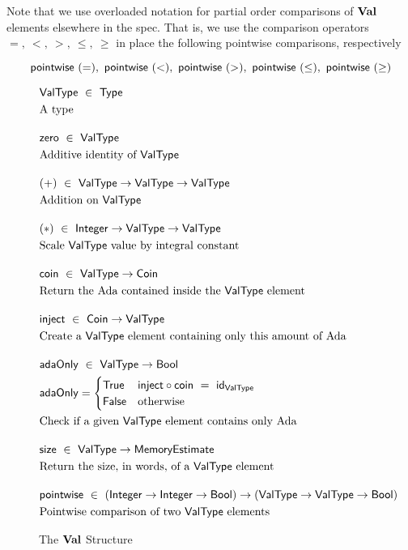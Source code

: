 Note that we use overloaded notation
for partial order comparisons of $\mathbf{Val}$ elements elsewhere in the spec. That is,
we use the comparison operators $=,~<,~>,~\leq,~\geq$ in place the following pointwise comparisons, respectively

\[ \mathsf{pointwise}~(=),~\mathsf{pointwise}~(<),~\mathsf{pointwise}~(>),~\mathsf{pointwise}~(\leq),~\mathsf{pointwise}~(\geq) \]

\begin{figure}[htb]
  \begin{align*}
      & \mathsf{ValType} ~\in~ \mathsf{Type}  \\
      & \text{A type}
      \nextdef
      & \fun{zero} ~\in~ \mathsf{ValType} \\
      & \text{Additive identity of $\mathsf{ValType}$}
      \nextdef
      & (+) ~\in~ \mathsf{ValType} \to \mathsf{ValType} \to \mathsf{ValType}\\
      & \text{Addition on $\mathsf{ValType}$}
      \nextdef
      & (*) ~\in~ \mathsf{Integer} \to \mathsf{ValType} \to \mathsf{ValType}\\
      & \text{Scale $\mathsf{ValType}$ value by integral constant}
      \nextdef
      & \fun{coin} ~\in~ \mathsf{ValType} \to \Coin\\
      & \text{Return the Ada contained inside the $\mathsf{ValType}$ element}
      \nextdef
      & \fun{inject} ~\in~ \Coin \to \mathsf{ValType}\\
      & \text{Create a $\mathsf{ValType}$ element containing only this amount of Ada}
      \nextdef
      & \fun{adaOnly} ~\in~ \mathsf{ValType} \to \Bool \\
      & \fun{adaOnly} =
        \begin{cases}
          \True & \fun{inject} \circ \fun{coin}~ = ~\fun{id}_{\mathsf{ValType}} \\
          \False & \text{otherwise}
        \end{cases} \\
      & \text{Check if a given $\mathsf{ValType}$ element contains only Ada}
      \nextdef
      & \fun{size} ~\in~ \mathsf{ValType} \to \MemoryEstimate\\
      & \text{Return the size, in words, of a $\mathsf{ValType}$ element}
      \nextdef
      & \fun{pointwise} ~\in~ (\Integer \to \Integer \to \Bool) \to (\mathsf{ValType} \to \mathsf{ValType} \to \Bool)\\
      & \text{Pointwise comparison of two $\mathsf{ValType}$ elements}
  \end{align*}
  \caption{The $\mathbf{Val}$ Structure}
  \label{fig:ValMonoid}
\end{figure}

